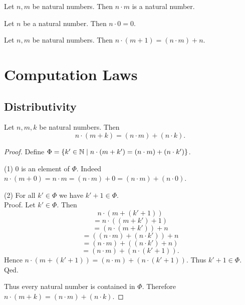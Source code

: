 \documentclass[10pt]{article}
\begin{document}
  \begin{forthel}
    \begin{lemma}
      Let $n, m$ be natural numbers.
      Then $n \cdot m$ is a natural number.
    \end{lemma}
  \end{forthel}

  \begin{forthel}
    \begin{lemma}
      Let $n$ be a natural number.
      Then $n \cdot 0 = 0$.
    \end{lemma}
  \end{forthel}

  \begin{forthel}
    \begin{lemma}
      Let $n, m$ be natural numbers.
      Then $n \cdot (m + 1) = (n \cdot m) + n$.
    \end{lemma}
  \end{forthel}


  \section{Computation Laws}

  \subsection{Distributivity}

  \begin{forthel}
    \begin{proposition}
      Let $n, m, k$ be natural numbers.
      Then \[ n \cdot (m + k) = (n \cdot m) + (n \cdot k). \]
    \end{proposition}
    \begin{proof}
      Define $\Phi = \{ k' \in \mathbb{N} \mid n \cdot (m + k') =
      (n \cdot m) + (n \cdot k') \}$.

      (1) $0$ is an element of $\Phi$.
      Indeed $n \cdot (m + 0)
        = n \cdot m
        = (n \cdot m) + 0
        = (n \cdot m) + (n \cdot 0)$.

      (2) For all $k' \in \Phi$ we have $k' + 1 \in \Phi$. \\
      Proof.
        Let $k'\in \Phi$.
        Then
        \[  n \cdot (m + (k' + 1))                  \]
        \[    = n \cdot ((m + k') + 1)              \]
        \[    = (n \cdot (m + k')) + n              \]
        \[    = ((n \cdot m) + (n \cdot k')) + n    \]
        \[    = (n \cdot m) + ((n \cdot k') + n)    \]
        \[    = (n \cdot m) + (n \cdot (k' + 1)).   \]
        Hence $n \cdot (m + (k' + 1)) = (n \cdot m) + (n \cdot (k' + 1))$.
        Thus $k' + 1 \in \Phi$.
      Qed.

      Thus every natural number is contained in $\Phi$.
      Therefore $n \cdot (m + k) = (n \cdot m) + (n \cdot k)$.
    \end{proof}
  \end{forthel}
\end{document}
